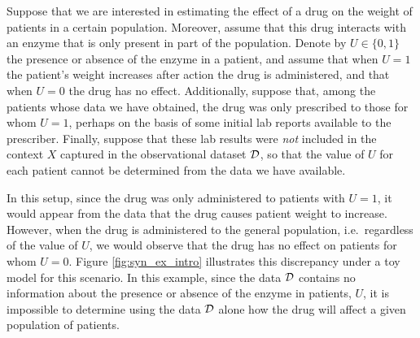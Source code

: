 \begin{importantresultwithtitle}[title=Toy example: Unmeasured confounding in medical decision-making]\noindent
Suppose that we are interested in estimating the effect of a drug on the weight of patients in a certain population. 
Moreover, assume that this drug interacts with an enzyme that is only present in part of the population.
Denote by $U \in \{0, 1\}$ the presence or absence of the enzyme in a patient, and assume that when $U = 1$ the patient's weight increases after action the drug is administered, and that when $U = 0$ the drug has no effect.
Additionally, suppose that, among the patients whose data we have obtained, the drug was only prescribed to those for whom $U = 1$, perhaps on the basis of some initial lab reports available to the prescriber.
Finally, suppose that these lab results were \emph{not} included in the context $X$ captured in the observational dataset $\mathcal{D}$, so that the value of $U$ for each patient cannot be determined from the data we have available. 

In this setup, since the drug was only administered to patients with $U=1$, it would appear from the data that the drug causes patient weight to increase. 
However, when the drug is administered to the general population, i.e.\ regardless of the value of $U$, we would observe that the drug has no effect on patients for whom $U=0$. Figure \ref{fig:syn_ex_intro} illustrates this discrepancy under a toy model for
this scenario. In this example, since the data $\mathcal{D}$ contains no information about the presence or absence of the enzyme in patients, $U$, it is impossible to determine using the data $\mathcal{D}$ alone how the drug will affect a given population of patients. 

    
\end{importantresultwithtitle}


